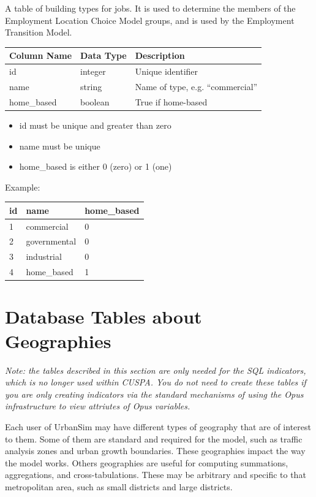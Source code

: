A table of building types for jobs.  It is used to determine the members
of the Employment Location Choice Model groups, and is used by the Employment
Transition Model.

\begin{tabular}{|l|l|l|}
\hline
\textbf{Column Name} & \textbf{Data Type} & \textbf{Description} \\
\hline
id & integer & Unique identifier  \\
\hline
name & string & Name of type, e.g. ``commercial''  \\ \hline
home_based & boolean & True if home-based  \\
\hline
\end{tabular}

\begin{itemize} \tight
\item id must be unique and greater than zero
\item name must be unique
\item home_based is either 0 (zero) or 1 (one)
\end{itemize}

Example:\\[2mm]
\begin{tabular}{|l|l|l|}
\hline
id & name & home_based \\\hline
1 & commercial & 0 \\\hline
2 & governmental & 0  \\\hline
3 & industrial & 0 \\\hline
4 & home_based & 1 \\\hline
\end{tabular}


\section{Database Tables about Geographies}

\emph{Note: the tables described in this section are only needed for the SQL
indicators, which is no longer used within CUSPA. You do not need to create
these tables if you are only creating indicators via the standard mechanisms of
using the Opus infrastructure to view attriutes of Opus variables.}

Each user of UrbanSim may have different types of geography that are of
interest to them. Some of them are standard and required for the model, such as
traffic analysis zones and urban growth boundaries. These geographies
impact the way the model works. Others geographies are useful for
computing summations, aggregations, and cross-tabulations. These may be
arbitrary and specific to that metropolitan area, such as small districts and
large districts.

